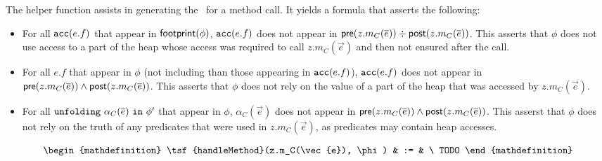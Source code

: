 %
%
\noindent
The  helper function assists in generating the \WLP\ for a method call.
It yields a formula that asserts the following:
\begin{itemize}

  \item For all $\texttt{acc}(e.f)$ that appear in $\textsf{footprint}(\phi)$, $\texttt{acc}(e.f)$ does not appear in $\textsf{pre}(z.m_C(\overline{e})) \div \textsf{post}(z.m_C(\overline{e}))$. This asserts that $\phi$ does not use access to a part of the heap whose access was required to call $z.m_C(\vec{e})$ and then not ensured after the call.

  \item For all $e.f$ that appear in $\phi$ (not including than those appearing in $\texttt{acc}(e.f)$), $\texttt{acc}(e.f)$ does not appear in $\textsf{pre}(z.m_C(\overline{e})) \land \textsf{post}(z.m_C(\overline{e}))$. This asserts that $\phi$ does not rely on the value of a part of the heap that was accessed by $z.m_C(\vec{e})$.

  \item For all $\texttt{unfolding} \ \alpha_C(\overline{e}) \ \texttt{in} \ \phi^\prime$ that appear in $\phi$, $\alpha_C(\vec{e})$ does not appear in $\textsf{pre}(z.m_C(\overline{e})) \land \textsf{post}(z.m_C(\overline{e}))$. This asserst that $\phi$ does not rely on the truth of any predicates that were used in $z.m_C(\vec{e})$, as predicates may contain heap accesses.
\end{itemize}
%
\begin{align*} \begin{mathdefinition}
\tsf{handleMethod}(z.m_C(\vec{e}), \phi) & :=
  & \ TODO
%
\end{mathdefinition} \end{align*}
%
